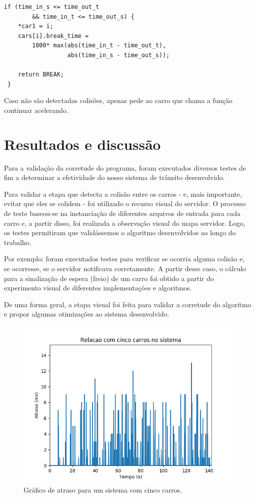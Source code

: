 \documentclass[10pt,twocolumn,letterpaper]{article}
\begin{document}
\begin{lstlisting}[caption={Continuação do algoritmo de detecção de colisão (3)}, label=Algorithm]
if (time_in_s <= time_out_t 
        && time_in_t <= time_out_s) {
    *car1 = i;
    cars[i].break_time = 
        1000* max(abs(time_in_t - time_out_t), 
                  abs(time_in_s - time_out_s));
    
    return BREAK;
 }
\end{lstlisting}

Caso não são detectadas colisões, apenas pede ao carro que chama a função continuar acelerando.

\section{Resultados e discussão}
Para a validação da corretude do programa, foram executados diversos testes de fim a determinar a efetividade do nosso sistema de trânsito desenvolvido.

Para validar a etapa que detecta a colisão entre os carros - e, mais importante, evitar que eles se colidem - foi utilizado o recurso visual do servidor. O processo de teste baseou-se na instanciação de diferentes arquivos de entrada para cada carro e, a partir disso, foi realizada a observação visual do mapa servidor. Logo, os testes permitiram que validássemos o algoritmo desenvolvidos ao longo do trabalho.

Por exemplo: foram executados testes para verificar se ocorria alguma colisão e, se ocorresse, se o servidor notificava corretamente. A partir desse caso, o cálculo para a sinalização de espera (freio) de um carro foi obtido a partir do experimento visual de diferentes implementações e algoritmos.

De uma forma geral, a etapa visual foi feita para validar a corretude do algoritmo e propor algumas otimizações ao sistema desenvolvido.

\begin{figure}[ht!]
    \center\includegraphics[width=.75\hsize]{img/cinco}
    \caption{Gráfico de atraso para um sistema com cinco carros.}
\end{figure}
\end{document}
